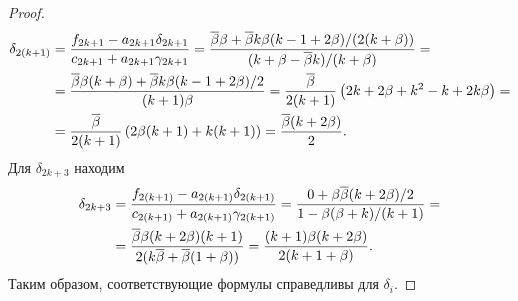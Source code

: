 {\begin{proof}
  \begin{align*}
    \delta_{2(k+1)} 
    &=
      \frac{f_{2k+1} - a_{2k+1}\delta_{2k+1}}{c_{2k+1} + a_{2k+1}\gamma_{2k+1}} =
      \frac{{{\overline{\beta}}} \beta + {{\overline{\beta}}} k\beta(k-1+2\beta)/(2(k+\beta))}{(k + \beta - {{\overline{\beta}}} k)/(k + \beta)} = \\
    &=
      \frac{{{\overline{\beta}}} \beta (k+\beta) + {{\overline{\beta}}} k \beta (k-1+2\beta)/2}{(k+1)\beta} =
      \frac{{{\overline{\beta}}}}{2(k+1)} \left( 
      2k + 2\beta + k^2 - k + 2 k \beta
      \right) = \\
    &=
      \frac{{{\overline{\beta}}}}{2(k+1)}\left(
      2\beta(k+1) + k(k+1)
      \right) =
      \frac{{{\overline{\beta}}}(k+2\beta)}{2}.
  \end{align*}
  Для $\delta_{2k+3}$ находим
  \begin{align*}
    \delta_{2k+3} 
    &=
      \frac{f_{2(k+1)} - a_{2(k+1)} \delta_{2(k+1)}}{c_{2(k+1)} + a_{2(k+1)}\gamma_{2(k+1)}} =
      \frac{0 + \beta {{\overline{\beta}}} (k + 2\beta)/2}{1 - \beta (\beta + k)/(k+1)} = \\
    &=
      \frac{{{\overline{\beta}}} \beta (k+2\beta)(k+1)}{2(k{{\overline{\beta}}} + {{\overline{\beta}}}(1+\beta))} =
      \frac{(k+1)\beta(k+2\beta)}{2(k+1+\beta)}.
  \end{align*}
  Таким образом, соответствующие формулы справедливы для $\delta_i$.
\end{proof}

}
